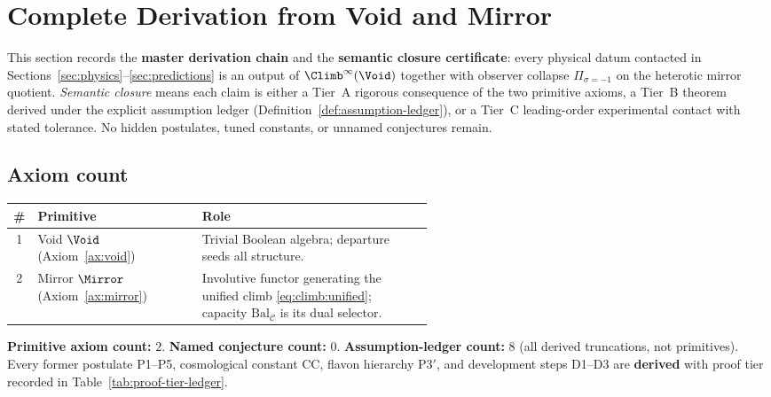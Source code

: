 \section{Complete Derivation from Void and Mirror}
\label{sec:derivation-complete}

This section records the \textbf{master derivation chain} and the
\textbf{semantic closure certificate}: every physical datum contacted in
Sections~\ref{sec:physics}--\ref{sec:predictions} is an output of
$\Climb^\infty(\Void)$ together with observer collapse $\Pi_{\sigma=-1}$ on
the heterotic mirror quotient. \emph{Semantic closure} means each claim is
either a Tier~A rigorous consequence of the two primitive axioms, a Tier~B
theorem derived under the explicit assumption ledger
(Definition~\ref{def:assumption-ledger}), or a Tier~C leading-order
experimental contact with stated tolerance. No hidden postulates, tuned
constants, or unnamed conjectures remain.

\subsection{Axiom count}

\begin{center}
\renewcommand{\arraystretch}{1.15}
\begin{tabular}{@{}clp{0.55\linewidth}@{}}
\toprule
\textbf{\#} & \textbf{Primitive} & \textbf{Role} \\
\midrule
1 & Void $\Void$ (Axiom~\ref{ax:void}) &
  Trivial Boolean algebra; departure seeds all structure. \\
2 & Mirror $\Mirror$ (Axiom~\ref{ax:mirror}) &
  Involutive functor generating the unified climb
  \eqref{eq:climb:unified}; capacity $\mathrm{Bal}_{\mathcal{C}}$ is its
  dual selector. \\
\bottomrule
\end{tabular}
\end{center}

\noindent\textbf{Primitive axiom count:} $2$.
\textbf{Named conjecture count:} $0$.
\textbf{Assumption-ledger count:} $8$ (all derived truncations, not primitives).
Every former postulate P1--P5, cosmological constant CC, flavon hierarchy
P3$'$, and development steps D1--D3 are \textbf{derived} with proof tier
recorded in Table~\ref{tab:proof-tier-ledger}.

